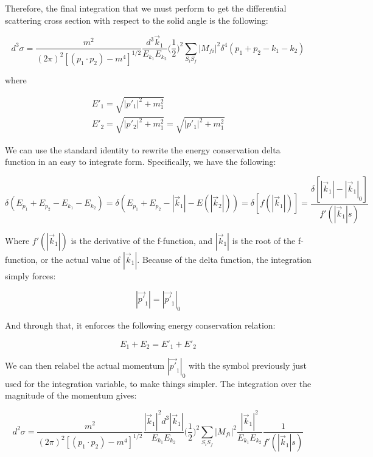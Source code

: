 \documentclass[a4]{article}
\begin{document}
    Therefore, the final integration that we must perform to get the differential scattering cross section with respect to the solid angle is the following:

    \begin{equation}
        d^3 \sigma = \frac{m^2}{(2 \pi)^2 [(p_1 \cdot p_2) - m^4]^{1/2}} \frac{d^3 \vec{k}_1}{E_{k_1} E_{k_2}} \bigg( \frac{1}{2} \bigg)^2 \sum_{S_i S_f} |M_{fi}|^2 \delta^4 (p_1 + p_2 - k_1 - k_2)
    \end{equation}

    where

    \begin{eqnarray}
        E'_1 = \sqrt{|p'_1|^2 + m_1^2} \\
        E'_2 = \sqrt{|p'_2|^2 + m_1^2} = \sqrt{|p'_1|^2 + m_1^2}
    \end{eqnarray}

    We can use the standard identity to rewrite the energy conservation delta function in an easy to integrate form. Specifically, we have the following: 

    \begin{equation}
        \delta (E_{p_1} + E_{p_2} - E_{k_1} - E_{k_2}) = \delta (E_{p_1} + E_{p_2} - |\vec{k}_1| - E (|\vec{k}_2|) ) = \delta [f (|\vec{k}_1|)] = \frac{\delta [|\vec{k}_1| - |\vec{k}_1|_0]}{f' (|\vec{k}_1|s)}
    \end{equation}

    Where $f'(|\vec{k}_1|)$ is the derivative of the f-function, and $|\vec{k}_1|$ is the root of the f-function, or the actual value of $|\vec{k}_1|$. Because of the delta function, the integration simply forces:

    \[
        |\vec{p'}_1| = |\vec{p'}_1|_0
    \]

    And through that, it enforces the following energy conservation relation:

    \begin{equation}
        E_1 + E_2 = E'_1 + E'_2
    \end{equation}

    We can then relabel the actual momentum $|\vec{p'}_1|_0$ with the symbol previously just used for the integration variable, to make things simpler. The integration over the magnitude of the momentum gives: 

    \begin{equation}
        d^2 \sigma = \frac{m^2}{(2 \pi)^2 [(p_1 \cdot p_2) - m^4]^{1/2}} \frac{|\vec{k}_1|^2 d^3 |\vec{k}_1|}{E_{k_1} E_{k_2}} \bigg( \frac{1}{2} \bigg)^2 \sum_{S_i S_f} |M_{fi}|^2 \frac{|\vec{k}_1|^2}{E_{k_1} E_{k_2}} \frac{1}{f' (|\vec{k}_1|s)}
    \end{equation}
\end{document}
